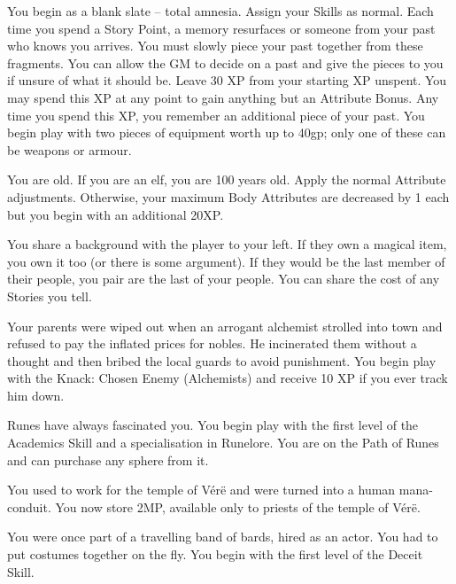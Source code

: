 \begin{multicols}{2}
\begin{list}{\addtocounter{list}{1}\textbf{:}}{\raggedleft}
\item{You begin as a blank slate -- total amnesia.
Assign your Skills as normal.
Each time you spend a Story Point, a memory resurfaces or someone from your past who knows you arrives.
You must slowly piece your past together from these fragments.
You can allow the GM to decide on a past and give the pieces to you if unsure of what it should be.
Leave 30 XP from your starting XP unspent.
You may spend this XP at any point to gain anything but an Attribute Bonus.
Any time you spend this XP, you remember an additional piece of your past.
You begin play with two pieces of equipment worth up to 40gp; only one of these can be weapons or armour.}

\item{You are old.  If you are an elf, you are 100 years old.  Apply the normal Attribute adjustments.  Otherwise, your maximum Body Attributes are decreased by 1 each but you begin with an additional 20XP.}

\item{You share a background with the player to your left.  If they own a magical item, you own it too (or there is some argument).  If they would be the last member of their people, you pair are the last of your people.  You can share the cost of any Stories you tell.}

\item{Your parents were wiped out when an arrogant alchemist strolled into town and refused to pay the inflated prices for nobles.  He incinerated them without a thought and then bribed the local guards to avoid punishment.  You begin play with the Knack: Chosen Enemy (Alchemists) and receive 10 XP if you ever track him down.}

\item{Runes have always fascinated you.  You begin play with the first level of the Academics Skill and a specialisation in Runelore.  You are on the Path of Runes and can purchase any sphere from it.}

\item{You used to work for the temple of V\'{e}r\"{e} and were turned into a human mana-conduit.  You now store 2MP, available only to priests of the temple of V\'{e}r\"{e}.}

\item{You were once part of a travelling band of bards, hired as an actor.  You had to put costumes together on the fly.  You begin with the first level of the Deceit Skill.}


\end{list}
\end{multicols}
